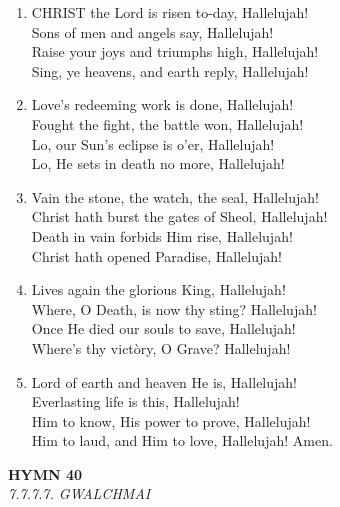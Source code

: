 \documentclass[11pt,a4paper]{article}
\begin{document}
\begin{enumerate}
    \item CHRIST the Lord is risen to-day, Hallelujah! \\
        Sons of men and angels say, Hallelujah! \\
        Raise your joys and triumphs high, Hallelujah! \\
        Sing, ye heavens, and earth reply, Hallelujah!

    \item Love's redeeming work is done, Hallelujah! \\
        Fought the fight, the battle won, Hallelujah! \\
        Lo, our Sun's eclipse is o'er, Hallelujah! \\
        Lo, He sets in death no more, Hallelujah!

    \item Vain the stone, the watch, the seal, Hallelujah! \\
        Christ hath burst the gates of Sheol, Hallelujah! \\
        Death in vain forbids Him rise, Hallelujah! \\
        Christ hath opened Paradise, Hallelujah!

    \item Lives again the glorious King, Hallelujah! \\
        Where, O Death, is now thy sting? Hallelujah! \\
        Once He died our souls to save, Hallelujah! \\
        Where's thy vict\`ory, O Grave? Hallelujah!

    \item Lord of earth and heaven He is, Hallelujah! \\
        Everlasting life is this, Hallelujah! \\
        Him to know, His power to prove, Hallelujah! \\
        Him to laud, and Him to love, Hallelujah! Amen.

\end{enumerate}

\newpage
\begin{center}
    {\Large \textbf{HYMN 40}}
    \\
    \textit{7.7.7.7. GWALCHMAI}
\end{center}
\vspace{1em}
\end{document}
